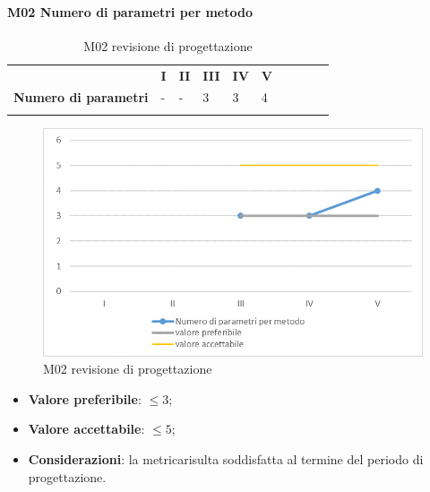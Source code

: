 \paragraph{M02 Numero di parametri per metodo} \mbox{}
\begin{longtable}[H!] {						
		>{}p{50mm}  		
		>{}p{8mm}
		>{}p{8mm}		
		>{}p{8mm}		
		>{}p{8mm}		
		>{}p{8mm}		
		>{}p{8mm}
		>{}p{8mm}
		>{}p{8mm}
		>{}p{8mm}
	}
	\rowcolor{gray!50}
	\textbf{} & \textbf{I} & \textbf{II} & \textbf{III} & \textbf{IV} & \textbf{V} \TBstrut \\ [2mm]
	\textbf{Numero di parametri} & - & - & 3 & 3 & 4 \TBstrut \\ [2mm]
	\rowcolor{white}
	\caption{M02 revisione di progettazione\glo}
\end{longtable}
\begin{figure}[H] 	
\includegraphics[width=\linewidth]{./img/grafici/RP2.png}	
\caption{M02 revisione di progettazione\glo}	
\end{figure}
\begin{itemize}
	\item \textbf{Valore preferibile}: $\le3$;
	\item \textbf{Valore accettabile}: $\le5$;
	\item \textbf{Considerazioni}: la metrica\glosp risulta soddisfatta al termine del periodo di progettazione\glo.
\end{itemize}
\pagebreak
